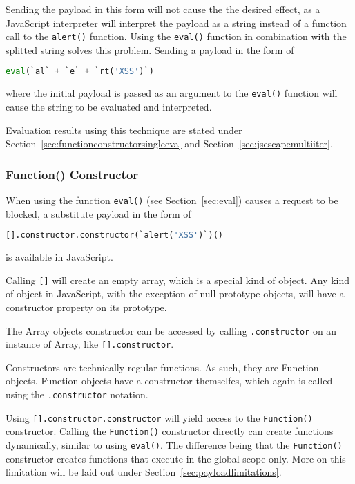 Sending the payload in this form will not cause the the desired effect, as a JavaScript interpreter will interpret the payload as a string instead of a function call to the \verb|alert()| function.
Using the \verb|eval()| function in combination with the splitted string solves this problem. Sending a payload in the form of

\begin{lstlisting}[style=basicStyle,language=Python]
eval(`al` + `e` + `rt('XSS')`)
\end{lstlisting}

where the initial payload is passed as an argument to the \verb|eval()| function will cause the string to be evaluated and interpreted.

Evaluation results using this technique are stated under Section~\ref{sec:functionconstructorsingleeva} and Section~\ref{sec:jsescapemultiiter}.

\subsubsection{Function() Constructor}
\label{sec:functionconstructor}

When using the function \verb|eval()| (see Section~\ref{sec:eval}) causes a request to be blocked, a substitute payload in the form of

\begin{lstlisting}[style=basicStyle,language=Python]
[].constructor.constructor(`alert('XSS')`)()
\end{lstlisting}

is available in JavaScript.

Calling \verb|[]| will create an empty array, which is a special kind of object.
Any kind of object in JavaScript, with the exception of null prototype objects, will have a constructor property on its prototype. \cite{js/object}

The Array objects constructor can be accessed by calling \verb|.constructor| on an instance of Array, like \verb|[].constructor|. \cite{js/array}

Constructors are technically regular functions. As such, they are Function objects. Function objects have a constructor themselfes, which again is called using the \verb|.constructor| notation. \cite{js/constructor}

Using \verb|[].constructor.constructor| will yield access to the \verb|Function()| constructor.
Calling the \verb|Function()| constructor directly can create functions dynamically, similar to using \verb|eval()|.
The difference being that the \verb|Function()| constructor creates functions that execute in the global scope only. More on this limitation will be laid out under Section~\ref{sec:payloadlimitations}.

